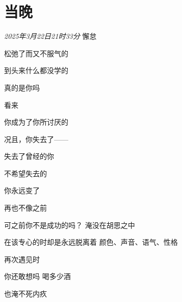 \section*{当晚}
\begin{center}
\textit{2025年3月22日21时33分}\hh 
懈怠

松弛了而又不服气的

到头来什么都没学的

真的是你吗

看来

你成为了你所讨厌的

况且，你失去了——

失去了曾经的你

不希望失去的

你永远变了

再也不像之前

可之前你不是成功的吗？\hh 
淹没在胡思之中

在该专心的时却是永远脱离着\hh 
颜色、声音、语气、性格

再次遇见时

你还敢想吗\hh
喝多少酒

也淹不死内疚
\end{center}